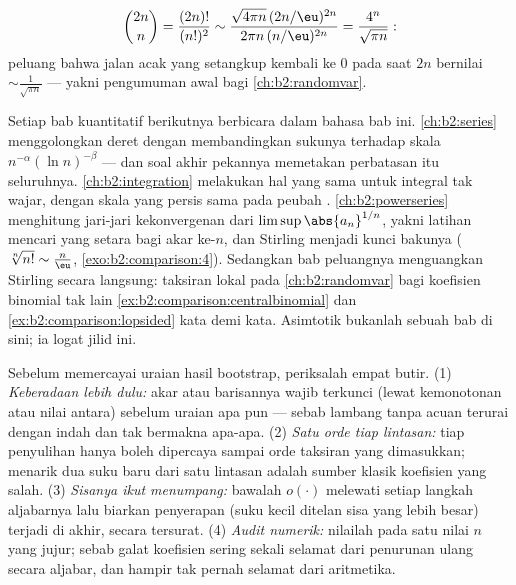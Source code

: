 \begin{example}\label{ex:b2:comparison:centralbinomial}
\[
\binom{2n}{n} = \frac{(2n)!}{(n!)^2}
\sim \frac{\sqrt{4\pi n}\,(2n/\eu)^{2n}}{2\pi n\,(n/\eu)^{2n}}
= \frac{4^n}{\sqrt{\pi n}} :
\]
peluang bahwa jalan acak yang setangkup kembali ke $0$ pada saat
$2n$ bernilai $\sim \frac{1}{\sqrt{\pi n}}$ --- yakni pengumuman awal
bagi \cref{ch:b2:randomvar}.
\end{example}

\begin{remark}\label{rem:b2:comparison:perspectives}
Setiap bab kuantitatif berikutnya berbicara dalam bahasa bab
ini. \cref{ch:b2:series} menggolongkan deret dengan membandingkan
sukunya terhadap skala $n^{-\alpha}(\ln n)^{-\beta}$ --- dan soal
akhir pekannya memetakan perbatasan itu seluruhnya.
\cref{ch:b2:integration} melakukan hal yang sama untuk integral tak
wajar, dengan skala yang persis sama pada peubah .
\cref{ch:b2:powerseries} menghitung jari-jari kekonvergenan dari
$\limsup\abs{a_n}^{1/n}$, yakni latihan mencari yang setara bagi akar
ke-$n$, dan Stirling menjadi kunci bakunya ($\sqrt[n]{n!}
\sim \frac n\eu$, \cref{exo:b2:comparison:4}). Sedangkan bab
peluangnya menguangkan Stirling secara langsung: taksiran
lokal pada \cref{ch:b2:randomvar} bagi koefisien binomial
tak lain \cref{ex:b2:comparison:centralbinomial} dan
\cref{ex:b2:comparison:lopsided} kata demi kata. Asimtotik bukanlah
sebuah bab di sini; ia logat jilid ini.
\end{remark}

\begin{method}\label{met:b2:comparison:checklist}
Sebelum memercayai uraian hasil bootstrap, periksalah empat butir.
(1) \emph{Keberadaan lebih dulu:} akar atau barisannya wajib
terkunci (lewat kemonotonan atau nilai antara) sebelum uraian apa pun
--- sebab lambang tanpa acuan terurai dengan indah dan tak bermakna
apa-apa. (2) \emph{Satu orde tiap lintasan:} tiap penyulihan hanya
boleh dipercaya sampai orde taksiran yang dimasukkan; menarik
dua suku baru dari satu lintasan adalah sumber klasik koefisien yang
salah. (3) \emph{Sisanya ikut menumpang:} bawalah
$o(\cdot)$ melewati setiap langkah aljabarnya lalu biarkan penyerapan
(suku kecil ditelan sisa yang lebih besar) terjadi di
akhir, secara tersurat. (4) \emph{Audit numerik:} nilailah pada satu
nilai $n$ yang jujur; sebab galat koefisien sering sekali selamat dari
penurunan ulang secara aljabar, dan hampir tak pernah selamat dari
aritmetika.
\end{method}

